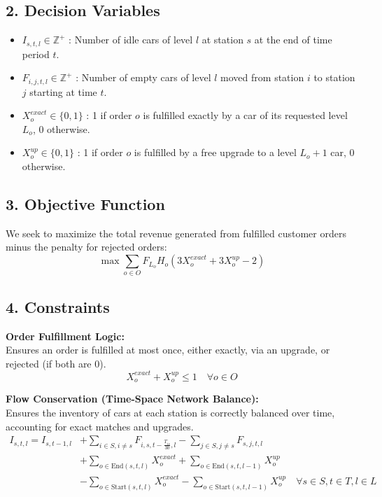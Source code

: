 \documentclass{article}
\begin{document}
\subsection*{2. Decision Variables}
\begin{itemize}
    \item $I_{s, t, l} \in \mathbb{Z}^+$ : Number of idle cars of level $l$ at station $s$ at the end of time period $t$.
    \item $F_{i, j, t, l} \in \mathbb{Z}^+$ : Number of empty cars of level $l$ moved from station $i$ to station $j$ starting at time $t$.
    \item $X_{o}^{exact} \in \{0, 1\}$ : 1 if order $o$ is fulfilled exactly by a car of its requested level $L_o$, 0 otherwise.
    \item $X_{o}^{up} \in \{0, 1\}$ : 1 if order $o$ is fulfilled by a free upgrade to a level $L_o + 1$ car, 0 otherwise.
\end{itemize}

\subsection*{3. Objective Function}
We seek to maximize the total revenue generated from fulfilled customer orders minus the penalty for rejected orders:
\begin{equation}
\max \sum_{o \in O} F_{L_o} H_o \left(3X_o^{exact} + 3X_o^{up} - 2\right)
\end{equation}

\subsection*{4. Constraints}

\textbf{Order Fulfillment Logic:} \\
Ensures an order is fulfilled at most once, either exactly, via an upgrade, or rejected (if both are 0).
\begin{equation}
X_{o}^{exact} + X_{o}^{up} \leq 1 \quad \forall o \in O
\end{equation}

\vspace{0.5em}
\textbf{Flow Conservation (Time-Space Network Balance):} \\
Ensures the inventory of cars at each station is correctly balanced over time, accounting for exact matches and upgrades.
\begin{align}
I_{s, t, l} = I_{s, t - 1, l} &+ \sum_{i \in S, i \neq s} F_{i, s, t - \frac{T_{is}}{30}, l} - \sum_{j \in S, j \neq s} F_{s, j, t, l} \nonumber \\
&+ \sum_{o \in \text{End}(s,t,l)} X_o^{exact} + \sum_{o \in \text{End}(s,t,l-1)} X_o^{up} \nonumber \\
&- \sum_{o \in \text{Start}(s,t,l)} X_o^{exact} - \sum_{o \in \text{Start}(s,t,l-1)} X_o^{up} \quad \forall s \in S, t \in T, l \in L
\end{align}
\end{document}
